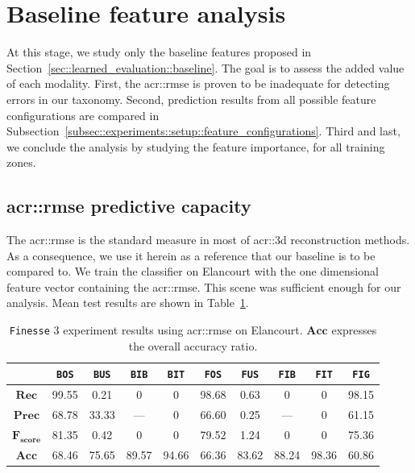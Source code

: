 
\section{Baseline feature analysis}
    \label{sec::experiments::baseline_feature_analysis}
    At this stage, we study only the baseline features proposed in Section~\ref{sec::learned_evaluation::baseline}.
    The goal is to assess the added value of each modality.
    First, the \gls{acr::rmse} is proven to be inadequate for detecting errors in our taxonomy.
    Second, prediction results from all possible feature configurations are compared in Subsection~\ref{subsec::experiments::setup::feature_configurations}.
    Third and last, we conclude the analysis by studying the feature importance, for all training zones.

    \subsection{\acrshort*{acr::rmse} predictive capacity}
        \label{subsec::experiments::baseline_feature_analysis::rmse}
        The \gls{acr::rmse} is the standard measure in most of \gls{acr::3d} reconstruction methods.
        As a consequence, we use it herein as a reference that our baseline is to be compared to.
        We train the classifier on Elancourt with the one dimensional feature vector containing the \gls{acr::rmse}.
        This scene was sufficient enough for our analysis.
        Mean test results are shown in Table~\ref{tab::rmse_results}.\\

        \begin{table}[htpb]
            \footnotesize
            \begin{tabular}{c c c c c c c c c c}
                \toprule
                & \texttt{BOS} & \texttt{BUS} & \texttt{BIB} & \texttt{BIT} & \texttt{FOS} & \texttt{FUS} & \texttt{FIB} & \texttt{FIT} & \texttt{FIG} \\
                \midrule
                \(\bm{Rec}\) & 99.55 & 0.21 & 0 & 0 & 98.68 & 0.63 & 0 & 0 & 98.15 \\
                \midrule
                \(\bm{Prec}\) & 68.78 & 33.33 & --- & 0 & 66.60 & 0.25 & --- & 0 & 61.15 \\
                \midrule
                \(\bm{F_{score}}\) & 81.35 & 0.42 & 0 & 0 & 79.52 & 1.24 & 0 & 0 & 75.36 \\
                \midrule
                \(\bm{Acc}\) & 68.46 & 75.65 & 89.57 & 94.66 & 66.36 & 83.62 & 88.24 & 98.36 & 60.86 \\
                \bottomrule
            \end{tabular}
            \caption{
                \label{tab::rmse_results} \texttt{Finesse} 3 experiment results using \gls{acr::rmse} on Elancourt.
                \(\bm{Acc}\) expresses the overall accuracy ratio.
            }
        \end{table}


